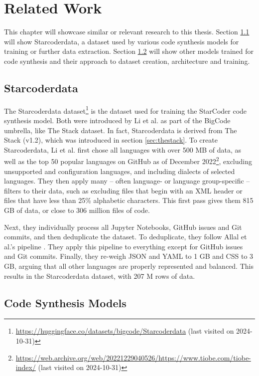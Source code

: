 \chapter{Related Work}
\label{chap:related}

This chapter will showcase similar or relevant research to this thesis.
Section \ref{sec:starcoder} will show Starcoderdata, a dataset used by various code synthesis models for training or further data extraction.
Section \ref{sec:synthmodels} will show other models trained for code synthesis and their approach to dataset creation, architecture and training.

\section{Starcoderdata}
\label{sec:starcoder}
The Starcoderdata dataset\footnote{\url{https://huggingface.co/datasets/bigcode/Starcoderdata} (last visited on 2024-10-31)} is the dataset used for training the StarCoder code synthesis model.
Both were introduced by Li et al. \cite{Li.2023} as part of the BigCode umbrella, like The Stack dataset.
In fact, Starcoderdata is derived from The Stack (v1.2), which was introduced in section \ref{sec:thestack}.
To create Starcoderdata, Li et al. first chose all languages with over 500 MB of data, as well as the top 50 popular languages on GitHub as of December 2022\footnote{\url{https://web.archive.org/web/20221229040526/https://www.tiobe.com/tiobe-index/} (last visited on 2024-10-31)}, excluding unsupported and configuration languages, and including dialects of selected languages.
They then apply many -- often language- or language group-specific -- filters to their data, such as excluding files that begin with an XML header or files that have less than 25\% alphabetic characters.
This first pass gives them 815 GB of data, or close to 306 million files of code.

Next, they individually process all Jupyter Notebooks, GitHub issues and Git commits, and then deduplicate the dataset.
To deduplicate, they follow Allal et al.'s pipeline \cite{Allal.2023}.
They apply this pipeline to everything except for GitHub issues and Git commits.
Finally, they re-weigh JSON and YAML to 1 GB and CSS to 3 GB, arguing that all other languages are properly represented and balanced.
This results in the Starcoderdata dataset, with 207 M rows of data.


\section{Code Synthesis Models}
\label{sec:synthmodels}

